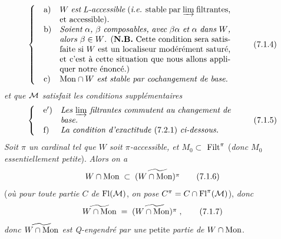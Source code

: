 \[
\left\{
\begin{array}{@{\quad}l@{\quad}p{0.6\textwidth}}
\text{a)} & \textit{$W$ est L-accessible} (\textit{i.e.} stable par $\varinjlim$ filtrantes, et accessible). \\[1.5ex]
\text{b)} & \textit{Soient $\alpha$, $\beta$ composables, avec $\beta\alpha$ et $\alpha$ dans $W$, alors $\beta \in W$.} (\textbf{N.B.} Cette condition sera satisfaite si $W$ est un localiseur modérément saturé, et c'est à cette situation que nous allons appliquer notre énoncé.) \\[1.5ex]
\text{c)} & $\Mon \cap W$ \textit{est stable par cochangement de base.}
\end{array}
\right.
\tag*{(7.1.4)}
\]
\textit{et que $\mathcal{M}$ satisfait les conditions supplémentaires}
\[
\left\{
\begin{array}{@{\quad}l@{\quad}p{0.6\textwidth}}
\text{e$'$)} & \textit{Les $\varinjlim$ filtrantes commutent au changement de base.} \\[1.5ex]
\text{f)} & \textit{La condition d'exactitude} (7.2.1) \textit{ci-dessous.}
\end{array}
\right.
\tag*{(7.1.5)}
\]
\textit{Soit $\pi$ un cardinal tel que $W$ soit $\pi$-accessible, et $M_0 \subset$} $\mathrm{Filt}^{\pi}$ (\textit{donc $M_0$ essentiellement petite}). \textit{Alors on a}
\[
W \cap \Mon \;\subset\; \widetilde{(W \cap \Mon)^{\pi}}
\tag*{(7.1.6)}
\]
(\textit{où pour toute partie $C$ de} $\mathrm{Fl}(\mathcal{M})$, \textit{on pose} $C^{\pi} = C \cap \mathrm{Fl}^{\pi}(\mathcal{M})$), \textit{donc}
\[
\widetilde{W \cap \Mon} \;=\; \widetilde{(W \cap \Mon)^{\pi}} \;,
\tag*{(7.1.7)}
\]
\textit{donc $\widetilde{W \cap \mathrm{Mon}}$ est Q-engendré par une} petite \textit{partie de} $W \cap \mathrm{Mon}$.

